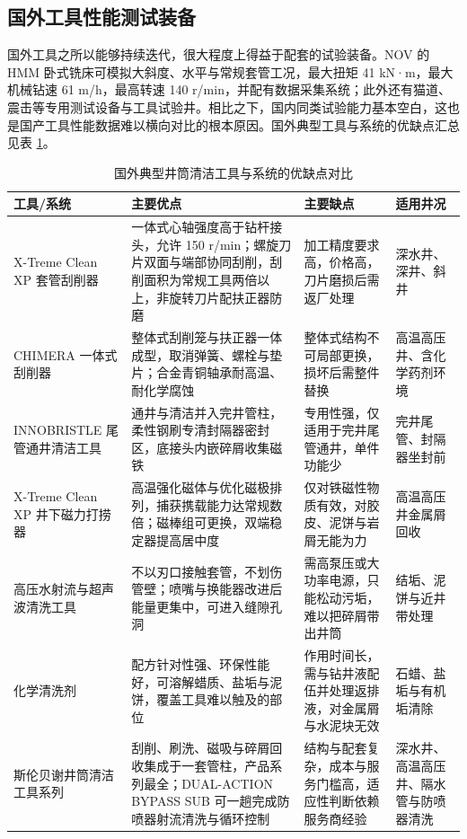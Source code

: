 \subsection{国外工具性能测试装备}

国外工具之所以能够持续迭代，很大程度上得益于配套的试验装备。NOV 的 HMM 卧式铣床可模拟大斜度、水平与常规套管工况，最大扭矩 41 kN·m，最大机械钻速 61 m/h，最高转速 140 r/min，并配有数据采集系统；此外还有猫道、震击等专用测试设备与工具试验井。相比之下，国内同类试验能力基本空白，这也是国产工具性能数据难以横向对比的根本原因。国外典型工具与系统的优缺点汇总见表 \ref{tab:foreign-tools}。

\begin{table}[H]
	\centering
	\caption{国外典型井筒清洁工具与系统的优缺点对比}
	\label{tab:foreign-tools}
	\footnotesize
	\renewcommand{\arraystretch}{1.3}
	\begin{tabularx}{\textwidth}{@{}>{\raggedright\arraybackslash}p{3.2cm}>{\raggedright\arraybackslash}X>{\raggedright\arraybackslash}X>{\raggedright\arraybackslash}p{2.6cm}@{}}
		\toprule
		工具/系统 & 主要优点 & 主要缺点 & 适用井况 \\
		\midrule
		X-Treme Clean XP 套管刮削器 & 一体式心轴强度高于钻杆接头，允许 150 r/min；螺旋刀片双面与端部协同刮削，刮削面积为常规工具两倍以上，非旋转刀片配扶正器防磨 & 加工精度要求高，价格高，刀片磨损后需返厂处理 & 深水井、深井、斜井 \\
		CHIMERA 一体式刮削器 & 整体式刮削笼与扶正器一体成型，取消弹簧、螺栓与垫片；合金青铜轴承耐高温、耐化学腐蚀 & 整体式结构不可局部更换，损坏后需整件替换 & 高温高压井、含化学药剂环境 \\
		INNOBRISTLE 尾管通井清洁工具 & 通井与清洁并入完井管柱，柔性钢刷专清封隔器密封区，底接头内嵌碎屑收集磁铁 & 专用性强，仅适用于完井尾管通井，单件功能少 & 完井尾管、封隔器坐封前 \\
		X-Treme Clean XP 井下磁力打捞器 & 高温强化磁体与优化磁极排列，捕获携载能力达常规数倍；磁棒组可更换，双端稳定器提高居中度 & 仅对铁磁性物质有效，对胶皮、泥饼与岩屑无能为力 & 高温高压井金属屑回收 \\
		高压水射流与超声波清洗工具 & 不以刃口接触套管，不划伤管壁；喷嘴与换能器改进后能量更集中，可进入缝隙孔洞 & 需高泵压或大功率电源，只能松动污垢，难以把碎屑带出井筒 & 结垢、泥饼与近井带处理 \\
		化学清洗剂 & 配方针对性强、环保性能好，可溶解蜡质、盐垢与泥饼，覆盖工具难以触及的部位 & 作用时间长，需与钻井液配伍并处理返排液，对金属屑与水泥块无效 & 石蜡、盐垢与有机垢清除 \\
		斯伦贝谢井筒清洁工具系列 & 刮削、刷洗、磁吸与碎屑回收集成于一套管柱，产品系列最全；DUAL-ACTION BYPASS SUB 可一趟完成防喷器射流清洗与循环控制 & 结构与配套复杂，成本与服务门槛高，适应性判断依赖服务商经验 & 深水井、高温高压井、隔水管与防喷器清洗 \\

\end{tabularx}
\end{table}
